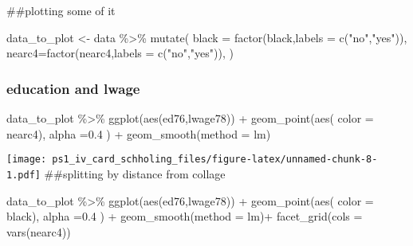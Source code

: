 \documentclass[
]{article}
\newenvironment{Shaded}{\begin{snugshade}}{\end{snugshade}}
\newcommand{\AttributeTok}[1]{\textcolor[rgb]{0.77,0.63,0.00}{#1}}
\newcommand{\FloatTok}[1]{\textcolor[rgb]{0.00,0.00,0.81}{#1}}
\newcommand{\FunctionTok}[1]{\textcolor[rgb]{0.00,0.00,0.00}{#1}}
\newcommand{\NormalTok}[1]{#1}
\newcommand{\OtherTok}[1]{\textcolor[rgb]{0.56,0.35,0.01}{#1}}
\newcommand{\SpecialCharTok}[1]{\textcolor[rgb]{0.00,0.00,0.00}{#1}}
\newcommand{\StringTok}[1]{\textcolor[rgb]{0.31,0.60,0.02}{#1}}
\begin{document}
\#\#plotting some of it

\begin{Shaded}
\begin{Highlighting}[]
\NormalTok{data\_to\_plot }\OtherTok{\textless{}{-}}\NormalTok{ data }\SpecialCharTok{\%\textgreater{}\%} 
  \FunctionTok{mutate}\NormalTok{(}
    \AttributeTok{black =} \FunctionTok{factor}\NormalTok{(black,}\AttributeTok{labels =} \FunctionTok{c}\NormalTok{(}\StringTok{"no"}\NormalTok{,}\StringTok{"yes"}\NormalTok{)),}
    \AttributeTok{nearc4=}\FunctionTok{factor}\NormalTok{(nearc4,}\AttributeTok{labels =} \FunctionTok{c}\NormalTok{(}\StringTok{"no"}\NormalTok{,}\StringTok{"yes"}\NormalTok{)),}
\NormalTok{         )}
\end{Highlighting}
\end{Shaded}

\hypertarget{education-and-lwage}{%
\subsubsection{education and lwage}\label{education-and-lwage}}

\begin{Shaded}
\begin{Highlighting}[]
\NormalTok{data\_to\_plot }\SpecialCharTok{\%\textgreater{}\%} \FunctionTok{ggplot}\NormalTok{(}\FunctionTok{aes}\NormalTok{(ed76,lwage78)) }\SpecialCharTok{+}
  \FunctionTok{geom\_point}\NormalTok{(}\FunctionTok{aes}\NormalTok{(}
    \AttributeTok{color =}\NormalTok{ nearc4),}
    \AttributeTok{alpha =}\FloatTok{0.4}\NormalTok{ ) }\SpecialCharTok{+}
  \FunctionTok{geom\_smooth}\NormalTok{(}\AttributeTok{method =}\NormalTok{ lm)}
\end{Highlighting}
\end{Shaded}

\texttt{[image: ps1\_iv\_card\_schholing\_files/figure-latex/unnamed-chunk-8-1.pdf]}
\#\#splitting by distance from collage

\begin{Shaded}
\begin{Highlighting}[]
\NormalTok{data\_to\_plot }\SpecialCharTok{\%\textgreater{}\%} \FunctionTok{ggplot}\NormalTok{(}\FunctionTok{aes}\NormalTok{(ed76,lwage78)) }\SpecialCharTok{+}
  \FunctionTok{geom\_point}\NormalTok{(}\FunctionTok{aes}\NormalTok{(}
    \AttributeTok{color =}\NormalTok{ black),}
    \AttributeTok{alpha =}\FloatTok{0.4}\NormalTok{ ) }\SpecialCharTok{+}
  \FunctionTok{geom\_smooth}\NormalTok{(}\AttributeTok{method =}\NormalTok{ lm)}\SpecialCharTok{+}
  \FunctionTok{facet\_grid}\NormalTok{(}\AttributeTok{cols =} \FunctionTok{vars}\NormalTok{(nearc4))}
\end{Highlighting}
\end{Shaded}
\end{document}
